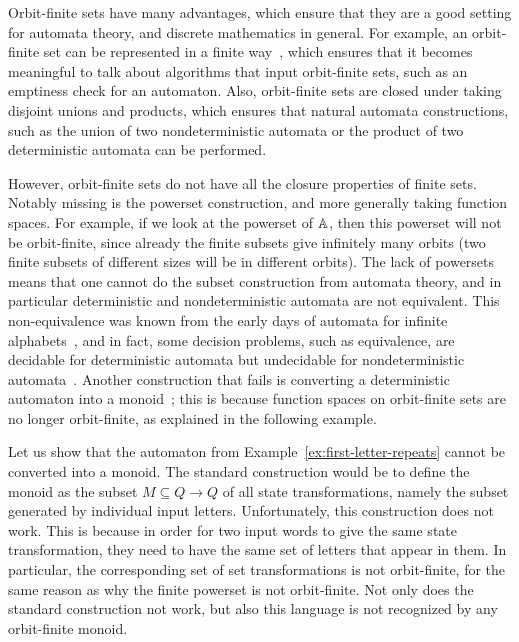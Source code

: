 Orbit-finite sets have many advantages, which ensure that they are a good setting for automata theory, and discrete mathematics in general. For example, an orbit-finite set can be represented in a finite way~\cite{bojanczyk_slightly2018}, which ensures that it becomes meaningful to talk about algorithms that input orbit-finite sets, such as an emptiness check for an automaton. Also, orbit-finite sets are closed under taking disjoint unions and products, which ensures that natural automata constructions, such as the union of two nondeterministic automata or the product of two deterministic automata can be performed.

However, orbit-finite sets do not have all the closure properties of finite sets. Notably missing is the powerset construction, and more generally taking function spaces. For example, if we look at the powerset of $\mathbb A$, then this powerset will not be orbit-finite, since already the finite subsets give infinitely many orbits (two finite subsets of different sizes will be in different orbits). The lack of powersets means that one cannot do the subset construction from automata theory, and in particular deterministic and nondeterministic automata are not equivalent. This non-equivalence was known from the early days of automata for infinite alphabets~\cite{kaminskiFiniteMemoryAutomata1994}, and in fact, some decision problems, such as equivalence, are decidable for deterministic automata but undecidable for nondeterministic automata~\cite{nevenFiniteStateMachines2004}. Another construction that fails is converting a deterministic automaton into a monoid~\cite[p.~221]{bojanczykNominalMonoids2013}; this is because function spaces on orbit-finite sets are no longer orbit-finite, as explained in the following example. 

\begin{example}\label{ex:first-letter-repeats-monoid}
    Let us show that the  automaton from Example~\ref{ex:first-letter-repeats} cannot be converted into a monoid. The standard construction would be to define the monoid as the subset $M \subseteq Q \to Q$ of all state transformations, namely the subset generated by individual input letters. 
    Unfortunately, this construction does not work. This is because in order  for  two input words to give the same state transformation, they need to have the same set of letters that appear in them. In particular, the corresponding set of set transformations is not orbit-finite, for the same reason as why the finite powerset is not orbit-finite. Not only does the standard construction not work, but also this language is not recognized by any orbit-finite monoid.\exampleend
\end{example}


